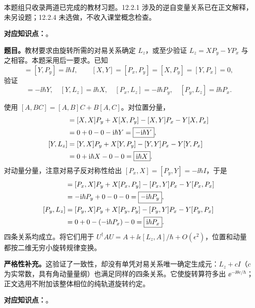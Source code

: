 本题组只收录两道已完成的教材习题。12.2.1 涉及的逆自变量关系已在正文解释，未另设题；12.2.4 未选做，不收入课堂概念检查。

\textbf{对应知识点：}。

\textbf{题目。}教材要求由旋转所需的对易关系确定 $L_z$，或至少验证 $L_z=XP_y-YP_x$ 与之相容。本题采用后一要求。已知
\begin{equation}
  [X,P_x]=[Y,P_y]=\ii\hbar I,\qquad
  [X,Y]=[P_x,P_y]=[X,P_y]=[Y,P_x]=0,
\end{equation}
验证
\begin{equation}
  [X,L_z]=-\ii\hbar Y,\quad [Y,L_z]=\ii\hbar X,\quad
  [P_x,L_z]=-\ii\hbar P_y,\quad [P_y,L_z]=\ii\hbar P_x.
\end{equation}

\begin{checkedsolution}
使用 $[A,BC]=[A,B]C+B[A,C]$。对位置分量，
\begin{align}
  [X,L_z]&=[X,X]P_y+X[X,P_y]-[X,Y]P_x-Y[X,P_x]\notag\\
         &=0+0-0-\ii\hbar Y=\boxed{-\ii\hbar Y},\\
  [Y,L_z]&=[Y,X]P_y+X[Y,P_y]-[Y,Y]P_x-Y[Y,P_x]\notag\\
         &=0+\ii\hbar X-0-0=\boxed{\ii\hbar X}.
\end{align}
对动量分量，注意对易子反对称性给出 $[P_x,X]=[P_y,Y]=-\ii\hbar I$，于是
\begin{align}
  [P_x,L_z]&=[P_x,X]P_y+X[P_x,P_y]-[P_x,Y]P_x-Y[P_x,P_x]\notag\\
           &=-\ii\hbar P_y+0-0-0=\boxed{-\ii\hbar P_y},\\
  [P_y,L_z]&=[P_y,X]P_y+X[P_y,P_y]-[P_y,Y]P_x-Y[P_y,P_x]\notag\\
           &=0+0-(-\ii\hbar P_x)-0=\boxed{\ii\hbar P_x}.
\end{align}
四条关系均成立。将它们用于 $U^\dagger A U=A+\ii\epsilon[L_z,A]/\hbar+O(\epsilon^2)$，位置和动量都按二维无穷小旋转规律变换。

\textbf{严格性补充。}这验证了一致性，却没有单凭对易关系唯一确定生成元：$L_z+cI$（$c$ 为实常数，具有角动量量纲）也满足同样的四条关系。它使旋转算符多出 $\ee^{-\ii\theta c/\hbar}$；正文选用不附加该整体相位的纯轨道旋转约定。
\end{checkedsolution}

\textbf{对应知识点：}。

